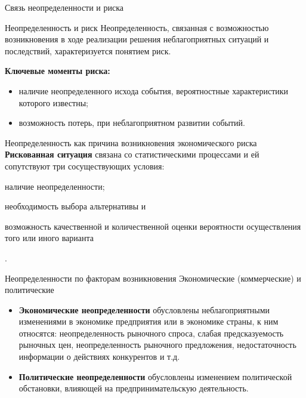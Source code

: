 \documentclass[financial_risks_lectures.tex]{subfiles}
\begin{document}
\begin{frame}{Связь неопределенности и риска}
\begin{block}{Неопределенность и риск}
Неопределенность, связанная с возможностью возникновения в ходе реализации решения неблагоприятных ситуаций и последствий, характеризуется понятием риск.
\end{block}
\textbf{Ключевые моменты риска:}
\begin{itemize}
\item
 наличие неопределенного исхода события, вероятностные характеристики которого известны;
 \item
 возможность потерь, при неблагоприятном развитии событий.
\end{itemize}
\end{frame}

\begin{frame}{Неопределенность как причина возникновения экономического риска}
\textbf{Рискованная ситуация} связана со статистическими процессами и ей сопутствуют три сосуществующих условия: \begin{inparaenum}
\item наличие неопределенности; \item необходимость выбора альтернативы и \item возможность качественной и количественной оценки вероятности осуществления того или иного варианта\end{inparaenum}.

\end{frame}

\begin{frame}{Неопределенности по факторам возникновения }{Экономические (коммерческие) и политические}
\begin{itemize}
\item
\textbf{Экономические неопределенности }обусловлены неблагоприятными изменениями в экономике предприятия или в экономике страны, к ним относятся: неопределенность рыночного спроса, слабая предсказуемость рыночных цен, неопределенность рыночного предложения, недостаточность информации о действиях конкурентов и т.д. 
\item
\textbf{Политические неопределенности }обусловлены изменением политической обстановки, влияющей на предпринимательскую деятельность. 

\end{itemize}
\end{frame}
\end{document}
